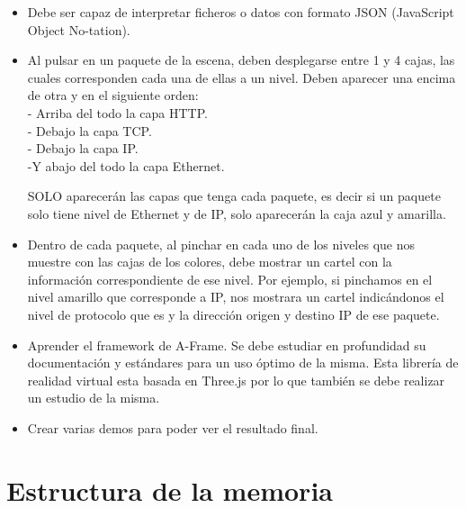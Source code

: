 \documentclass[a4paper, 12pt]{book}
\begin{document}
\begin{itemize}
\item Debe ser capaz de interpretar ficheros o datos con formato JSON (JavaScript Object No-tation).

\item Al pulsar en un paquete de la escena, deben desplegarse entre 1 y 4 cajas, las cuales corresponden cada una de ellas a un nivel. Deben aparecer una encima de otra y en el siguiente orden:\\
- Arriba del todo la capa HTTP.\\
- Debajo la capa TCP.\\
- Debajo la capa IP.\\
-Y abajo del todo la capa Ethernet.

SOLO aparecerán las capas que tenga cada paquete, es decir si un paquete solo tiene nivel de Ethernet y de IP, solo aparecerán la caja azul y amarilla.

\item Dentro de cada paquete, al pinchar en cada uno de los niveles que nos muestre con las cajas de los colores, debe mostrar un cartel con la información correspondiente de ese nivel. Por ejemplo, si pinchamos en el nivel amarillo que corresponde a IP, nos mostrara un cartel indicándonos el nivel de protocolo que es y la dirección origen y destino IP de ese paquete.

\item Aprender el framework de A-Frame. Se debe estudiar en profundidad su documentación y estándares para un uso óptimo de la misma. Esta librería de realidad virtual esta basada en Three.js por lo que también se debe realizar un estudio de la misma.

\item Crear varias demos para poder ver el resultado final.
\end{itemize}
\section{Estructura de la memoria}
\label{sec:estructura}
\end{document}
